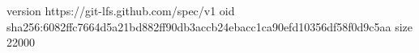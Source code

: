 version https://git-lfs.github.com/spec/v1
oid sha256:6082ffc7664d5a21bd882ff90db3accb24ebacc1ca90efd10356df58f0d9c5aa
size 22000
